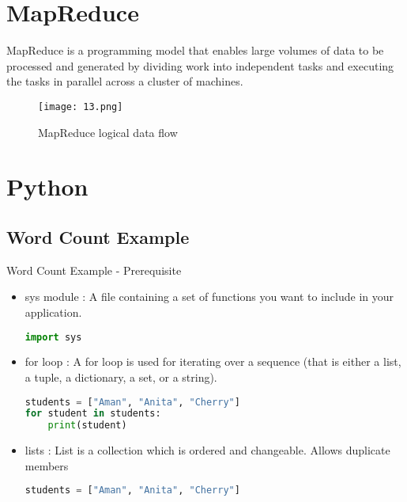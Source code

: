 \documentclass[pdf]{beamer}
\begin{document}
\section{MapReduce}
\begin{frame}[fragile]{}
MapReduce is a programming model that enables large volumes of data to be processed and generated by dividing work into independent tasks and executing the tasks in parallel across a cluster of machines.

\begin{figure}[ht]
	    \begin{center}
        		\texttt{[image: 13.png]}
    \end{center}
    \caption{MapReduce logical data flow\cite{hdg}}
    \end{figure}
\end{frame}



\section{Python}
\subsection{Word Count Example}
\begin{frame}[fragile]{Word Count Example - Prerequisite}
	\begin{itemize}
	\item sys module
	: A file containing a set of functions you want to include in your application.
\begin{lstlisting}[language=python]
import sys
\end{lstlisting}		
	\item for loop
	: A for loop is used for iterating over a sequence (that is either a list, a tuple, a dictionary, a set, or a string).
\begin{lstlisting}[language=python]
students = ["Aman", "Anita", "Cherry"] 
for student in students: 
	print(student)
\end{lstlisting}
	\item  lists : List is a collection which is ordered and changeable. Allows duplicate members
\begin{lstlisting}[language=python]
students = ["Aman", "Anita", "Cherry"] 
\end{lstlisting}	
\end{itemize}
\end{frame}
\end{document}
